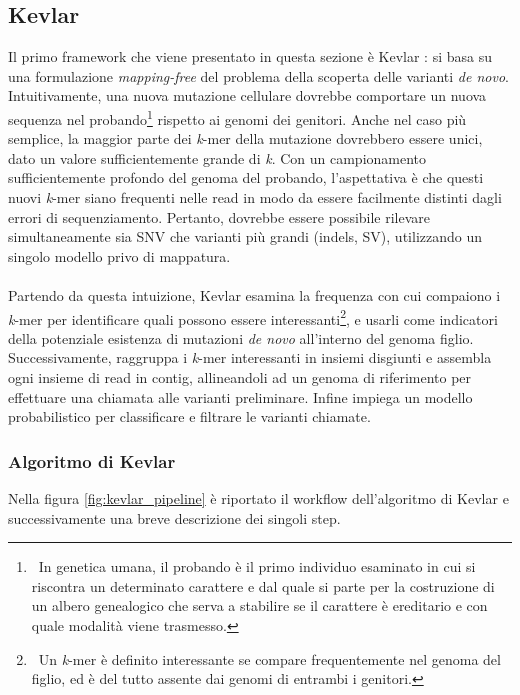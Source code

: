 \documentclass[../main.tex]{subfiles}
\begin{document}
\subsection{Kevlar}
\label{kevlar}

Il primo framework che viene presentato in questa sezione è Kevlar \cite{standage2019kevlar}: si basa su una formulazione \textit{mapping-free} del problema della scoperta delle varianti \textit{de novo}. Intuitivamente, una nuova mutazione cellulare dovrebbe comportare un nuova sequenza nel probando\footnote{\ In genetica umana, il probando è il primo individuo esaminato in cui si riscontra un determinato carattere e dal quale si parte per la costruzione di un albero genealogico che serva a stabilire se il carattere è ereditario e con quale modalità viene trasmesso.} rispetto ai genomi dei genitori. Anche nel caso più semplice, la maggior parte dei \textit{k}-mer della mutazione dovrebbero essere unici, dato un valore sufficientemente grande di \textit{k}. Con un campionamento sufficientemente profondo del genoma del probando, l'aspettativa è che questi nuovi \textit{k}-mer siano frequenti nelle read in modo da essere facilmente distinti dagli errori di sequenziamento. Pertanto, dovrebbe essere possibile rilevare simultaneamente sia SNV che varianti più grandi (indels, SV), utilizzando un singolo modello privo di mappatura.
\\\\
Partendo da questa intuizione, Kevlar esamina la frequenza con cui compaiono i \textit{k}-mer per identificare quali possono essere interessanti\footnote{\ Un \textit{k}-mer è definito interessante se compare frequentemente nel genoma del figlio, ed è del tutto assente dai genomi di entrambi i genitori.}, e usarli come indicatori della potenziale esistenza di mutazioni \textit{de novo} all'interno del genoma figlio. Successivamente, raggruppa i \textit{k}-mer interessanti in insiemi disgiunti e assembla ogni insieme di read in contig, allineandoli ad un genoma di riferimento per effettuare una chiamata alle varianti preliminare. Infine impiega un modello probabilistico per classificare e filtrare le varianti chiamate.

\subsubsection{Algoritmo di Kevlar}

Nella figura \ref{fig:kevlar_pipeline} è riportato il workflow dell'algoritmo di Kevlar e successivamente una breve descrizione dei singoli step.
\end{document}
